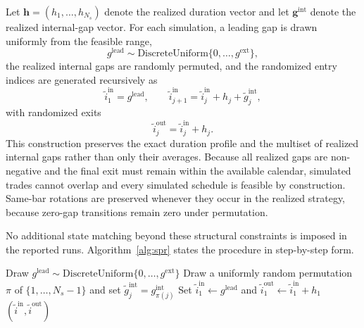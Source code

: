 \documentclass[risks,article,submit,pdftex,oneauthor]{Definitions/mdpi}
\begin{document}
Let \(\mathbf{h}=(h_1,\ldots,h_{N_s})\) denote the realized duration vector and let \(\mathbf{g}^{\mathrm{int}}\) denote the realized internal-gap vector. For each simulation, a leading gap is drawn uniformly from the feasible range,
\begin{equation}
g^{\mathrm{lead}} \sim \mathrm{DiscreteUniform}\{0,\ldots,g^{\mathrm{ext}}\},
\end{equation}
the realized internal gaps are randomly permuted, and the randomized entry indices are generated recursively as
\begin{equation}
\tilde{i}^{\mathrm{in}}_1=g^{\mathrm{lead}}, \qquad
\tilde{i}^{\mathrm{in}}_{j+1}=\tilde{i}^{\mathrm{in}}_j+h_j+\tilde{g}^{\mathrm{int}}_j,
\end{equation}
with randomized exits
\begin{equation}
\tilde{i}^{\mathrm{out}}_j=\tilde{i}^{\mathrm{in}}_j+h_j.
\end{equation}
This construction preserves the exact duration profile and the multiset of realized internal gaps rather than only their averages. Because all realized gaps are non-negative and the final exit must remain within the available calendar, simulated trades cannot overlap and every simulated schedule is feasible by construction. Same-bar rotations are preserved whenever they occur in the realized strategy, because zero-gap transitions remain zero under permutation.

No additional state matching beyond these structural constraints is imposed in the reported runs. Algorithm~\ref{alg:spr} states the procedure in step-by-step form.

\begin{algorithm}[H]
\caption{Structure-preserving randomization of a single trade schedule}
\label{alg:spr}
Draw $g^{\mathrm{lead}}\sim\mathrm{DiscreteUniform}\{0,\ldots,g^{\mathrm{ext}}\}$\;
Draw a uniformly random permutation $\pi$ of $\{1,\ldots,N_s-1\}$ and set $\tilde{g}^{\mathrm{int}}_j=g^{\mathrm{int}}_{\pi(j)}$\;
Set $\tilde{i}^{\mathrm{in}}_1\leftarrow g^{\mathrm{lead}}$ and $\tilde{i}^{\mathrm{out}}_1\leftarrow \tilde{i}^{\mathrm{in}}_1+h_1$\;
\Return $(\tilde{i}^{\mathrm{in}},\tilde{i}^{\mathrm{out}})$
\end{algorithm}
\end{document}
